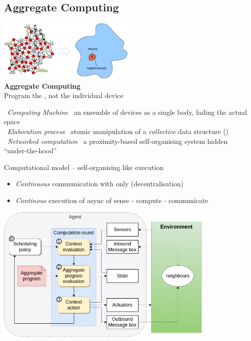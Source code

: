 \documentclass[presentation, 8pt]{beamer}\mode<presentation>{\usetheme{AMSBolognaFC}}
\begin{document}
\subsection{Aggregate Computing}
\begin{frame}[c, plain]
\begin{center}
	\includegraphics[width=0.5\textwidth]{img/aggregate-computing-structure.png}\\
	{\Huge \textbf{Aggregate Computing}}\\
	{\large Program the , not the individual device} \\[0.2cm]
\end{center}
{\faCircle \, \normalsize{\emph{Computing Machine}} \faArrowRight \, an ensemble of devices as a single body, fading the actual space}\\
{\faCircle \, \normalsize{\emph{Elaboration process}} \faArrowRight \, atomic manipulation of a \emph{collective} data structure ()}\\
{\faCircle \, \normalsize{\emph{Networked computation}} \faArrowRight \,
a proximity-based self-organising system hidden ``under-the-hood''}
\end{frame}
\begin{frame}{Computational model -- self-organising like execution}
\begin{itemize}
	\item \emph{Continuous} communication with  only (\faArrowRight decentralisation)
	\item \emph{Continous} execution of async  of sense - compute - communicate
\end{itemize}
\centering
\includegraphics[width=0.8\textwidth]{img/execution-step.png}
\end{frame}
\end{document}

